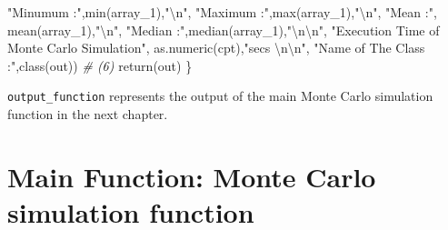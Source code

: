 \documentclass[11pt,a4paper]{article}
\newenvironment{Shaded}{\begin{snugshade}}{\end{snugshade}}
\newcommand{\CommentTok}[1]{\textcolor[rgb]{0.56,0.35,0.01}{\textit{#1}}}
\newcommand{\FunctionTok}[1]{\textcolor[rgb]{0.00,0.00,0.00}{#1}}
\newcommand{\NormalTok}[1]{#1}
\newcommand{\SpecialCharTok}[1]{\textcolor[rgb]{0.00,0.00,0.00}{#1}}
\newcommand{\StringTok}[1]{\textcolor[rgb]{0.31,0.60,0.02}{#1}}
\begin{document}
\begin{Shaded}
\begin{Highlighting}[]
           \StringTok{"Minumum :"}\NormalTok{,}\FunctionTok{min}\NormalTok{(array\_1),}\StringTok{"}\SpecialCharTok{\textbackslash{}n}\StringTok{"}\NormalTok{,}
           \StringTok{"Maximum :"}\NormalTok{,}\FunctionTok{max}\NormalTok{(array\_1),}\StringTok{"}\SpecialCharTok{\textbackslash{}n}\StringTok{"}\NormalTok{,}
           \StringTok{"Mean    :"}\NormalTok{, }\FunctionTok{mean}\NormalTok{(array\_1),}\StringTok{"}\SpecialCharTok{\textbackslash{}n}\StringTok{"}\NormalTok{,}
           \StringTok{"Median  :"}\NormalTok{,}\FunctionTok{median}\NormalTok{(array\_1),}\StringTok{"}\SpecialCharTok{\textbackslash{}n\textbackslash{}n}\StringTok{"}\NormalTok{,}
           \StringTok{"Execution Time of Monte Carlo Simulation"}\NormalTok{,}
           \FunctionTok{as.numeric}\NormalTok{(cpt),}\StringTok{"secs }\SpecialCharTok{\textbackslash{}n\textbackslash{}n}\StringTok{"}\NormalTok{,}
           \StringTok{"Name of The Class :"}\NormalTok{,}\FunctionTok{class}\NormalTok{(out))}
  \CommentTok{\# (6)}
  \FunctionTok{return}\NormalTok{(out)}
\NormalTok{\}}
\end{Highlighting}
\end{Shaded}

\texttt{output\_function} represents the output of the main Monte Carlo
simulation function in the next chapter.

\hypertarget{main-function-monte-carlo-simulation-function}{%
\section{Main Function: Monte Carlo simulation
function}\label{main-function-monte-carlo-simulation-function}}
\end{document}
